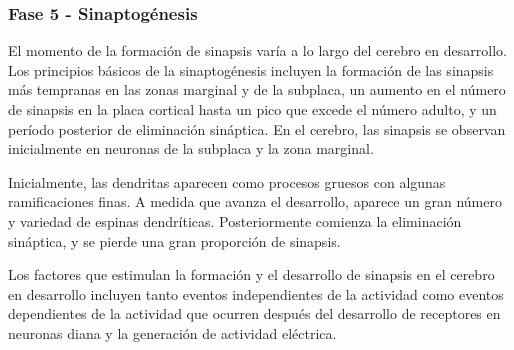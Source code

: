\documentclass[11pt,letterpaper]{report}
\begin{document}
\subsubsection{Fase 5 - Sinaptogénesis}
El momento de la formación de sinapsis varía a lo largo del cerebro en
desarrollo. Los principios básicos de la sinaptogénesis incluyen la formación
de las sinapsis más tempranas en las zonas marginal y de la subplaca, un
aumento en el número de sinapsis en la placa cortical hasta un pico que excede
el número adulto, y un período posterior de eliminación sináptica. En el
cerebro, las sinapsis se observan inicialmente en neuronas de la subplaca y la
zona marginal. \cite{Polin124}

Inicialmente, las dendritas aparecen como procesos gruesos con algunas 
ramificaciones finas. A medida que avanza el desarrollo, aparece un gran número
y variedad de espinas dendríticas. Posteriormente comienza la eliminación
sináptica, y se pierde una gran proporción de sinapsis. \cite{Polin124}

Los factores que estimulan la formación y el desarrollo de sinapsis en el
cerebro en desarrollo incluyen tanto eventos independientes de la actividad
como eventos dependientes de la actividad que ocurren después del desarrollo de
receptores en neuronas diana y la generación de actividad eléctrica.
\cite{Polin124}
\end{document}

